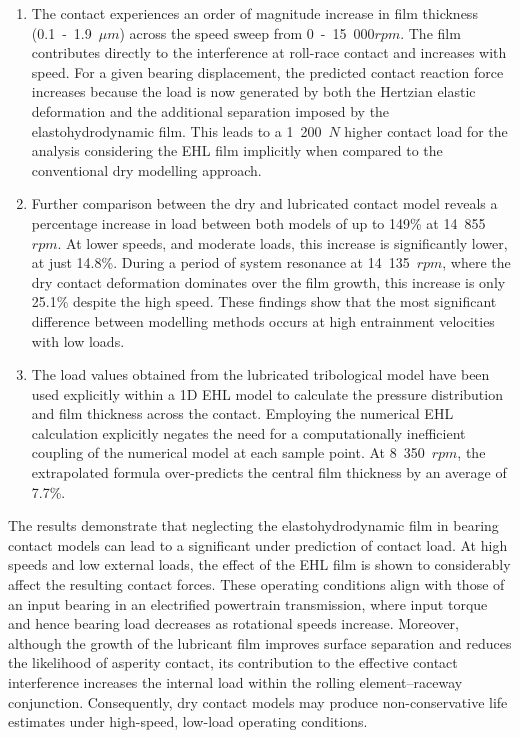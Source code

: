 \begin{enumerate}
	\item The contact experiences an order of magnitude increase in film thickness (0.1~-~1.9~$\mu m$) across the speed sweep from 0~-~15~000$rpm$. The film contributes directly to the interference at roll-race contact and increases with speed. For a given bearing displacement, the predicted contact reaction force increases because the load is now generated by both the Hertzian elastic deformation and the additional separation imposed by the elastohydrodynamic film.	This leads to a 1~200~$N$ higher contact load for the analysis considering the EHL film implicitly when compared to the conventional dry modelling approach.
	\item Further comparison between the dry and lubricated contact model reveals a percentage increase in load between both models of up to 149\% at 14~855~$rpm$. At lower speeds, and moderate loads, this increase is significantly lower, at just 14.8\%. During a period of system resonance at 14~135~$rpm$, where the dry contact deformation dominates over the film growth, this increase is only 25.1\% despite the high speed. These findings show that the most significant difference between modelling methods occurs at high entrainment velocities with low loads.
	\item The load values obtained from the lubricated tribological model have been used explicitly within a 1D EHL model to calculate the pressure distribution and film thickness across the contact. Employing the numerical EHL calculation explicitly negates the need for a computationally inefficient coupling of the numerical model at each sample point. At 8~350~$rpm$, the extrapolated formula over-predicts the central film thickness by an average of 7.7\%.
\end{enumerate}

The results demonstrate that neglecting the elastohydrodynamic film in bearing contact models can lead to a significant under prediction of contact load. At high speeds and low external loads, the effect of the EHL film is shown to considerably affect the resulting contact forces. These operating conditions align with those of an input bearing in an electrified powertrain transmission, where input torque and hence bearing load decreases as rotational speeds increase. Moreover, although the growth of the lubricant film improves surface separation and reduces the likelihood of asperity contact, its contribution to the effective contact interference increases the internal load within the rolling element–raceway conjunction. Consequently, dry contact models may produce non-conservative life estimates under high-speed, low-load operating conditions.


